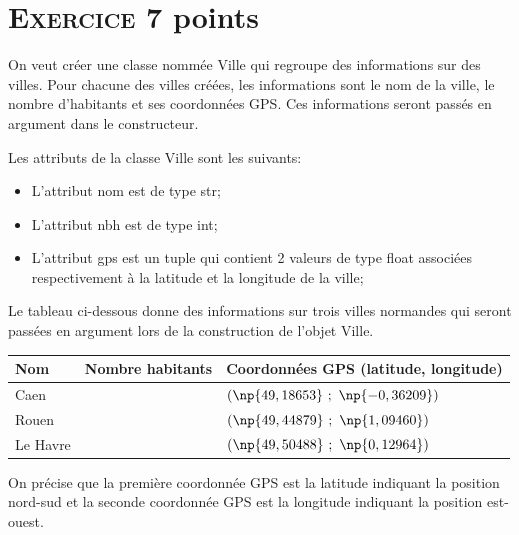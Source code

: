 \documentclass[11pt,a4paper]{article}
\newcounter{num}
\begin{document}
\newpage
\addtocounter{num}{1}
\section*{\textsc{Exercice \thenum } \hfill 7 points}
On veut créer une classe nommée \textsf{Ville} qui regroupe des informations sur des villes. Pour chacune des villes créées, les informations sont le nom de la ville, le nombre d'habitants et ses coordonnées GPS. Ces informations seront passés en argument dans le constructeur. \medskip

Les attributs de la classe Ville sont les suivants:
\begin{itemize}
\item L'attribut \textsf{nom} est de type \textsf{str};
\item L'attribut \textsf{nbh} est de type \textsf{int};
\item L'attribut \textsf{gps} est un tuple qui contient 2 valeurs de type float associées respectivement à la latitude et la longitude de la ville;
\end{itemize}

Le tableau ci-dessous donne des informations sur trois villes normandes qui seront passées en argument lors de la construction de l'objet Ville.

\begin{center}
\begin{tabular}{|C{3cm}|C{4cm}|C{8cm}|}\hline
\textbf{Nom} & \textbf{Nombre habitants} & \textbf{Coordonnées GPS (latitude, longitude)}\\\hline
Caen &  & $(\np{49,18653}~;~\np{-0,36209})$\\\hline
Rouen &  & $(\np{49,44879}~;~\np{1,09460})$\\\hline
Le Havre &  & $(\np{49,50488}~;~\np{0,12964})$\\\hline
\end{tabular}
\end{center}

On précise que la première coordonnée GPS est la latitude indiquant la position nord-sud et la seconde coordonnée GPS est la longitude indiquant la position est-ouest. \medskip
\end{document}
